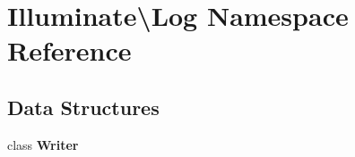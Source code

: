 \section{Illuminate\textbackslash{}Log Namespace Reference}
\label{namespace_illuminate_1_1_log}
\subsection*{Data Structures}
\begin{DoxyCompactItemize}
\item 
class {\bf Writer}
\end{DoxyCompactItemize}
